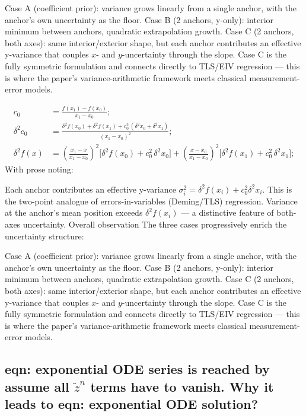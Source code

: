 \documentclass[twoside]{article}
\numberwithin{equation}{section}
\begin{document}
Case A (coefficient prior): variance grows linearly from a single anchor, with the anchor's own uncertainty as the floor.
Case B (2 anchors, y-only): interior minimum between anchors, quadratic extrapolation growth.
Case C (2 anchors, both axes): same interior/exterior shape, but each anchor contributes an effective y-variance that couples $x$- and $y$-uncertainty through the slope.
Case C is the fully symmetric formulation and connects directly to TLS/EIV regression — this is where the paper's variance-arithmetic framework meets classical measurement-error models.


\begin{align}
\label{eqn: first-order ODE two anchors slope xy}
c_0 &= \frac{f(x_1) - f(x_0)}{x_1 - x_0}; \\
\label{eqn: first-order ODE two anchors delta c xy}
\delta^2 c_0 &= \frac{\delta^2 f(x_0) + \delta^2 f(x_1) + c_0^2\,(\delta^2 x_0 + \delta^2 x_1)}{(x_1 - x_0)^2}; \\
\label{eqn: first-order ODE two anchors variance xy}
\delta^2 f(x) &= \left(\frac{x_1 - x}{x_1 - x_0}\right)^2 \bigl[\delta^2 f(x_0) + c_0^2\,\delta^2 x_0\bigr]
             + \left(\frac{x - x_0}{x_1 - x_0}\right)^2 \bigl[\delta^2 f(x_1) + c_0^2\,\delta^2 x_1\bigr];
\end{align}
With prose noting:

Each anchor contributes an effective y-variance $\sigma_i^2 = \delta^2 f(x_i) + c_0^2 \delta^2 x_i$.
This is the two-point analogue of errors-in-variables (Deming/TLS) regression.
Variance at the anchor's mean position exceeds $\delta^2 f(x_i)$ — a distinctive feature of both-axes uncertainty.
Overall observation
The three cases progressively enrich the uncertainty structure:

Case A (coefficient prior): variance grows linearly from a single anchor, with the anchor's own uncertainty as the floor.
Case B (2 anchors, y-only): interior minimum between anchors, quadratic extrapolation growth.
Case C (2 anchors, both axes): same interior/exterior shape, but each anchor contributes an effective y-variance that couples $x$- and $y$-uncertainty through the slope.
Case C is the fully symmetric formulation and connects directly to TLS/EIV regression — this is where the paper's variance-arithmetic framework meets classical measurement-error models.

\subsection{{eqn: exponential ODE series} is reached by assume all $\tilde{z}^n$ terms have to vanish.  Why it leads to {eqn: exponential ODE solution}?}
\end{document}
